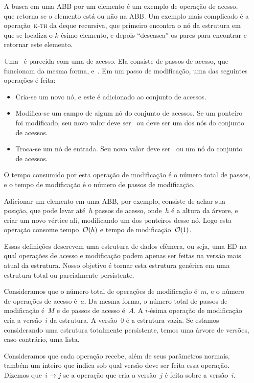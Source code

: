 \documentclass[../../main.tex]{subfiles}
\begin{document}
A busca em uma ABB por um elemento é um exemplo de operação de acesso, que retorna se o elemento está ou não na ABB. Um exemplo mais complicado é a operação~\textsc{k-th} da deque recursiva, que primeiro encontra o nó da estrutura em que se localiza o $k$-ésimo elemento, e depois ``descasca'' os pares para encontrar e retornar este elemento.

Uma~ é parecida com uma de acesso. Ela consiste de passos de acesso, que funcionam da mesma forma, e~. Em um passo de modificação, uma das seguintes operações é feita:
\begin{itemize}
	\item Cria-se um novo nó, e este é adicionado ao conjunto de acessos.
	\item Modifica-se um campo de algum nó do conjunto de acessos. Se um ponteiro foi modificado, seu novo valor deve ser~ ou deve ser um dos nós do conjunto de acessos.
	\item Troca-se um nó de entrada. Seu novo valor deve ser~ ou um nó do conjunto de acessos.
\end{itemize}

O tempo consumido por esta operação de modificação é o número total de passos, e o tempo de modificação é o número de passos de modificação.

Adicionar um elemento em uma ABB, por exemplo, consiste de achar sua posição, que pode levar até~$h$ passos de acesso, onde~$h$ é a altura da árvore, e criar um novo vértice ali, modificando um dos ponteiros desse nó. Logo esta operação consome tempo~$\mathcal{O}(h)$ e tempo de modificação~$\mathcal{O}(1)$.

Essas definições descrevem uma estrutura de dados efêmera, ou seja, uma ED na qual operações de acesso e modificação podem apenas ser feitas na versão mais atual da estrutura. Nosso objetivo é tornar esta estrutura genérica em uma estrutura total ou parcialmente persistente.

Consideramos que o número total de operações de modificação é~$m$, e o número de operações de acesso é~$a$. Da mesma forma, o número total de passos de modificação é~$M$ e de passos de acesso é~$A$. A $i$-ésima operação de modificação cria a versão~$i$ da estrutura. A versão~0 é a estrutura vazia. Se estamos considerando uma estrutura totalmente persistente, temos uma árvore de versões, caso contrário, uma lista.

Consideramos que cada operação recebe, além de seus parâmetros normais, também um inteiro que indica sob qual versão deve ser feita essa operação. Dizemos que~$i \rightarrow j$ se a operação que cria a versão~$j$ é feita sobre a versão~$i$.
\end{document}
